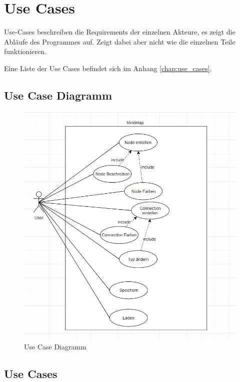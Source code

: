 \section{Use Cases}
\label{sec:use_cases}
Use-Cases beschreiben die Requirements der einzelnen Akteure, es zeigt die Abläufe des Programmes auf. Zeigt dabei aber nicht wie die einzelnen Teile funktionieren.

Eine Liste der Use Cases befindet sich im Anhang \ref{chap:use_cases}.

\subsection{Use Case Diagramm}
\label{subsec:use_case_diagramm}

\begin{figure}[H]
	\centering
		\includegraphics[scale=0.7]{images/UseCaseDiagram.PNG}
	\caption{Use Case Diagramm}
	\label{fig:use_case_diagramm}
\end{figure}

\subsection{Use Cases}
\label{subsec:use_cases}

